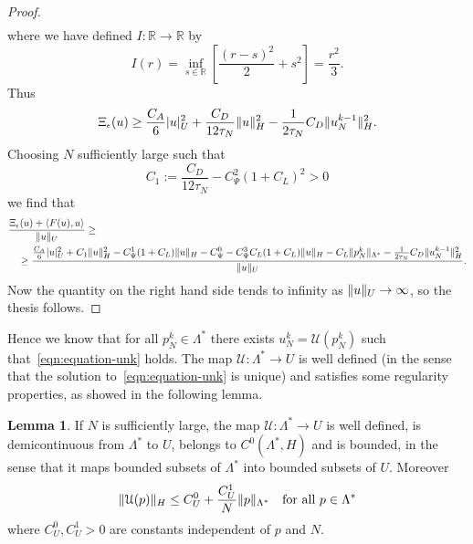 \documentclass[a4paper,10pt,oneside]{amsbook}
\numberwithin{section}{chapter}
\numberwithin{equation}{chapter}
\theoremstyle{definition}
\newtheorem{lemma}[prop]{Lemma}
\DeclarePairedDelimiter{\norm}{\lVert}{\rVert}
\DeclarePairedDelimiter{\dual}{\langle}{\rangle}
\begin{document}
\begin{proof}
\[\begin{split}
\end{split}
\]
where we have defined $I\colon\mathbb{R}\to\mathbb{R}$ by
\[
I(r)=\inf_{s\in\mathbb{R}}\left[\frac{(r-s)^2}{2}+s^2\right]=\frac{r^2}{3}.
\]
Thus
\[
\Xi_\epsilon(u)\ge\frac{C_A}{6}|u|_U^2+\frac{C_D}{12\tau_N}\norm{u}_H^2-\frac{1}{2\tau_N}C_D\norm{u_N^{k-1}}_H^2.
\]
Choosing $N$ sufficiently large such that
\[
C_1:=\frac{C_D}{12\tau_N}-C_\Psi^2(1+C_L)^2>0
\]
we find that
\[
\begin{multlined}
\frac{\Xi_\epsilon(u)+\dual{F(u),u}}{\norm{u}_U}\ge\\
\ge\frac{\frac{C_A}{6}|u|_U^2+C_1\norm{u}_H^2-C_\Psi^1(1+C_L)\norm{u}_H-C_\Psi^0-C_\Psi^3C_L(1+C_L)\norm{u}_H-C_L\norm{p_N^k}_{\Lambda^*}-\frac{1}{2\tau_N}C_D\norm{u_N^{k-1}}_H^2}{\norm{u}_U}.
\end{multlined}
\]
Now the quantity on the right hand side tends to infinity as $\norm{u}_U\to\infty$, so the thesis follows.
\end{proof}
Hence we know that for all $p_N^k\in\Lambda^*$ there exists $u_N^k=\mathcal{U}(p_N^k)$ such that~\eqref{eqn:equation-unk} holds. The map $\mathcal{U}\colon\Lambda^*\to U$ is well defined (in the sense that the solution to~\eqref{eqn:equation-unk} is unique) and satisfies some regularity properties, as showed in the following lemma.
\begin{lemma}
\label{lemma:properties-U}
If $N$ is sufficiently large, the map $\mathcal{U}\colon\Lambda^*\to U$ is well defined, is demicontinuous from $\Lambda^*$ to $U$, belongs to $C^0(\Lambda^*,H)$ and is bounded, in the sense that it maps bounded subsets of $\Lambda^*$ into bounded subsets of $U$. Moreover
\[
\norm{\mathcal{U}(p)}_H\le C_U^0+\frac{C_U^1}{N}\norm{p}_{\Lambda^*}\quad\text{for all $p\in\Lambda^*$}
\]
where $C_U^0,C_U^1>0$ are constants independent of $p$ and $N$.
\end{lemma}
\end{document}
